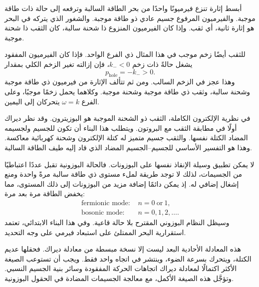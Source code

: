 أبسط إثارة تنزع فيرميونًا واحدًا من بحر الطاقة السالبة وترفعه إلى حالة ذات طاقة موجبة. والفيرميون المرفوع جسيم عادي ذو طاقة موجبة. والشغور الذي يتركه في البحر هو إثارة ثانية، أي ثقب. وإذا كان الفيرميون المنزوع ذا شحنة سالبة، كان الثقب ذا شحنة موجبة.

للثقب أيضًا زخم موجب في هذا المثال ذي الفرع الواحد. فإذا كان الفيرميون المفقود يشغل حالةً ذات زخم \(k_-<0\)، فإن إزالته تغير الزخم الكلي بمقدار
\begin{equation}
p_{\mathrm{hole}}=-k_->0.
\end{equation}
وهذا عجز في الزخم السالب. ومن ثم تتألف الإثارة من فيرميون ذي طاقة موجبة وشحنة سالبة، وثقب ذي طاقة موجبة وشحنة موجبة. وكلاهما يحمل زخمًا موجبًا، وعلى الفرع \(\omega=k\) يتحركان إلى اليمين.

في نظرية الإلكترون الكاملة، الثقب ذو الشحنة الموجبة هو البوزيترون. وقد نظر ديراك أولًا في مطابقة الثقب مع البروتون. ويتطلب هذا البناء أن تكون للجسيم ولجسيمه المضاد الكتلة نفسها. والثقب جسيم متميز له كتلة الإلكترون وشحنة كهربائية معاكسة. وهذا هو التفسير الأساسي للجسيم--الجسيم المضاد الذي قاد إليه طيف الطاقة السالبة.

لا يمكن تطبيق وسيلة الإنقاذ نفسها على البوزونات. فالحالة البوزونية تقبل عددًا اعتباطيًا من الجسيمات، لذلك لا توجد طريقة لملء مستوى ذي طاقة سالبة مرةً واحدة ومنع إشغال إضافي له. إذ يمكن دائمًا إضافة مزيد من البوزونات إلى ذلك المستوى، مما يخفض الطاقة مرة بعد مرة:
\begin{equation}
\begin{aligned}
\text{fermionic mode: }&n=0\ \text{or}\ 1,\\
\text{bosonic mode: }&n=0,1,2,\ldots .
\end{aligned}
\end{equation}
وسيظل النظام البوزوني المقترح بلا حالة قاعية. وفي هذا البناء الابتدائي، تعتمد استقرارية البحر الممتلئ على استبعاد فيرمي على وجه التحديد.

هذه المعادلة الأحادية البعد ليست إلا نسخة مبسطة من معادلة ديراك. فحقلها عديم الكتلة، ويتحرك بسرعة الضوء، وينتشر في اتجاه واحد فقط. ويجب أن تستوعب الصيغة الأكثر اكتمالًا لمعادلة ديراك اتجاهات الحركة المفقودة وسائر بنية الجسيم النسبي. وتؤجَّل هذه الصيغة الأكمل، مع معالجة الجسيمات المضادة في الحقول البوزونية.

